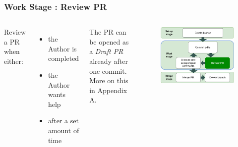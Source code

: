\documentclass[aspectratio=169]{beamer} %
\begin{document}
\begin{frame}
	\frametitle{Work Stage : Review PR}
	\begin{columns}[c]
		
		
		\normalsize
		Review a PR when either: \vspace{.3cm}
		\begin{itemize}
			\item the Author is completed 
			\item the Author wants help
			\item after a set amount of time 
		\end{itemize}
	
		\vspace{.5cm}

		The PR can be opened as a \textit{Draft PR} already after one commit. 
		More on this in Appendix A.

		
		\vspace{-.75cm}
		\begin{figure}
			\centering
			\includegraphics[width=\textwidth]{./img/branch-pr-merge-cycle-S2b.png}
		\end{figure}
		
	\end{columns}
\end{frame}
\end{document}
